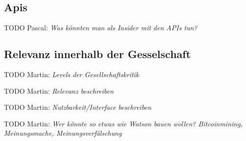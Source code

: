 \documentclass[german]{cgspaper} %
\newcommand{\todo}[1]{\textit{#1}}
\newcommand{\Martin}[1]{\textcolor{colorMartin}{TODO Martin:} \todo{#1} }
\newcommand{\Pascal}[1]{\textcolor{colorPascal}{TODO Pascal:} \todo{#1} }
\begin{document}
\subsection{Apis}

\Pascal{Was könnten man als Insider mit den APIs tun?}

\subsection{Relevanz innerhalb der Gesselschaft}

\Martin{Levels der Gesellschaftskritik}

\Martin{Relevanz beschreiben}

\Martin{Nutzbarkeit/Interface beschreiben}

\Martin{Wer könnte so etwas wie Watson bauen wollen? Bitcoinmining, Meinungsmache, Meinungsverfälschung}



\end{document}
